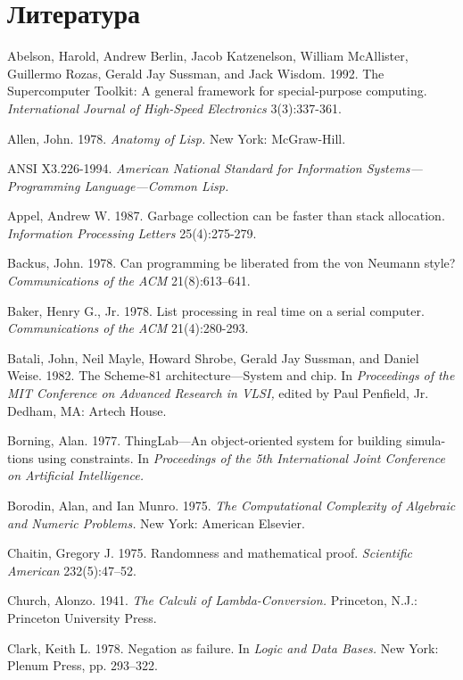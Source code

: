 \chapter*{Литература}
{
\parindent=0pt
\parskip=3mm
Abelson, Harold, Andrew Berlin, Jacob Katzenelson,
William McAllister,
Guiller\-mo Rozas, Gerald Jay Sussman, and Jack Wisdom. 1992.  The
Supercomputer Toolkit: A general framework for special-purpose
computing.  {\em International Journal of High-Speed Electronics}
3(3):337-361.

Allen, John.  1978.  {\em Anatomy of Lisp.} New York: McGraw-Hill.
                                                 
ANSI X3.226-1994. {\em American National Standard for Information
Sys\-tems---Pro\-g\-ram\-ming Language---Common Lisp.}

Appel, Andrew W.  1987.  Garbage collection can be faster than stack
allocation.  {\em Information Processing Letters} 25(4):275-279.

Backus, John.  1978.  Can programming be liberated from the von
Neumann style?  {\em Communications of the ACM} 21(8):613--641.%

Baker, Henry G., Jr.  1978.  List processing in real time on a serial
computer.  {\em Communications of the ACM} 21(4):280-293.

Batali, John, Neil Mayle, Howard Shrobe, Gerald Jay Sussman, and
Daniel Weise.  1982.  The Scheme-81 architecture---System and chip.
In {\em Proceedings of the MIT Conference on Advanced Research in
VLSI,} edited by Paul Penfield, Jr. Dedham, MA: Artech House.

Borning, Alan.  1977.  ThingLab---An object-oriented system for
building simula-ti\-ons using constraints. In {\em Proceedings of the 5th
International Joint Conference on Artificial Intelligence.}

Borodin, Alan, and Ian Munro.  1975.  {\em The Computational
Complexity of Algebraic and Numeric Problems.} New York: American
Elsevier.

Chaitin, Gregory J.  1975.  Randomness and mathematical proof.  
{\em Scientific Ame\-ri\-can} 232(5):47--52.

Church, Alonzo.  1941.  {\em The Calculi of Lambda-Conversion.}
Prin\-ce\-ton, N.J.: Prin\-ceton University Press.

Clark, Keith L.  1978.  Negation as failure.  In {\em Logic and Data
Bases.} New York: Plenum Press, pp. 293--322.

}
